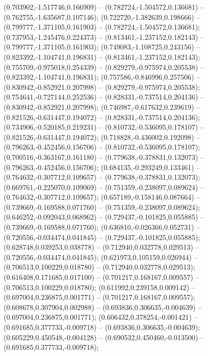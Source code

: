 (0.703902,-1.517746,0.166909) -- (0.782724,-1.504572,0.136681) -- (0.762755,-1.635687,0.107146);
 (0.722720,-1.382639,0.198666) -- (0.799777,-1.371105,0.161903) -- (0.782724,-1.504572,0.136681);
 (0.737953,-1.245476,0.224373) -- (0.813461,-1.237152,0.182143) -- (0.799777,-1.371105,0.161903);
 (0.749083,-1.108725,0.243156) -- (0.823392,-1.104741,0.196831) -- (0.813461,-1.237152,0.182143);
 (0.755709,-0.975018,0.254339) -- (0.829279,-0.975974,0.205538) -- (0.823392,-1.104741,0.196831);
 (0.757586,-0.846996,0.257506) -- (0.830942,-0.852921,0.207998) -- (0.829279,-0.975974,0.205538);
 (0.754641,-0.727144,0.252536) -- (0.828331,-0.737514,0.204136) -- (0.830942,-0.852921,0.207998);
 (0.746987,-0.617632,0.239619) -- (0.821526,-0.631447,0.194072) -- (0.828331,-0.737514,0.204136);
 (0.734906,-0.520185,0.219231) -- (0.810732,-0.536095,0.178107) -- (0.821526,-0.631447,0.194072);
 (0.718828,-0.436002,0.192098) -- (0.796263,-0.452456,0.156706) -- (0.810732,-0.536095,0.178107);
 (0.700516,-0.363167,0.161180) -- (0.779638,-0.378831,0.132073) -- (0.796263,-0.452456,0.156706);
 (0.684135,-0.293249,0.133461) -- (0.764632,-0.307712,0.109657) -- (0.779638,-0.378831,0.132073);
 (0.669761,-0.225070,0.109069) -- (0.751359,-0.238097,0.089624) -- (0.764632,-0.307712,0.109657);
 (0.657189,-0.158146,0.087664) -- (0.739669,-0.169588,0.071760) -- (0.751359,-0.238097,0.089624);
 (0.646252,-0.092043,0.068962) -- (0.729437,-0.101825,0.055885) -- (0.739669,-0.169588,0.071760);
 (0.636810,-0.026366,0.052731) -- (0.720556,-0.034474,0.041845) -- (0.729437,-0.101825,0.055885);
 (0.628748,0.039253,0.038778) -- (0.712940,0.032778,0.029513) -- (0.720556,-0.034474,0.041845);
 (0.621973,0.105159,0.026944) -- (0.706513,0.100229,0.018780) -- (0.712940,0.032778,0.029513);
 (0.616408,0.171685,0.017100) -- (0.701217,0.168167,0.009557) -- (0.706513,0.100229,0.018780);
 (0.611992,0.239158,0.009142) -- (0.697004,0.236875,0.001771) -- (0.701217,0.168167,0.009557);
 (0.608678,0.307904,0.002988) -- (0.693836,0.306635,-0.004639) -- (0.697004,0.236875,0.001771);
 (0.606432,0.378254,-0.001421) -- (0.691685,0.377733,-0.009718) -- (0.693836,0.306635,-0.004639);
 (0.605229,0.450548,-0.004128) -- (0.690532,0.450460,-0.013500) -- (0.691685,0.377733,-0.009718);
